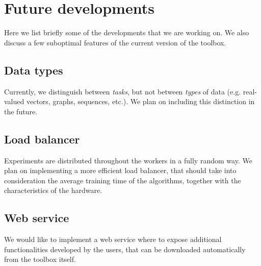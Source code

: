 \chapter{Future developments}
\label{chap:futuredevelopments}

Here we list briefly some of the developments that we are working on. We also discuss a few suboptimal features of the current version of the toolbox.

\section{Data types}

Currently, we distinguish between \textit{tasks}, but not between \textit{types} of data (e.g. real-valued vectors, graphs, sequences, etc.). We plan on including this distinction in the future.

\section{Load balancer}

Experiments are distributed throughout the workers in a fully random way. We plan on implementing a more efficient load balancer, that should take into consideration the average training time of the algorithms, together with the characteristics of the hardware.

\section{Web service}

We would like to implement a web service where to expose additional functionalities developed by the users, that can be downloaded automatically from the toolbox itself.